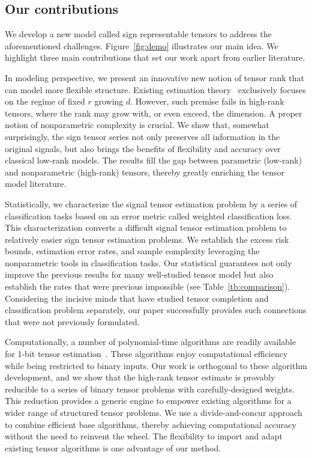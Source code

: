 \documentclass[twoside,11pt]{article}
\theoremstyle{plain}
\theoremstyle{definition}
\begin{document}
\subsection{Our contributions}
We develop a new model called sign representable tensors to address the aforementioned challenges. 
Figure~\ref{fig:demo} illustrates our main idea. 
We highlight three main contributions that set our work apart from earlier literature. 



In modeling perspective, we present an innovative new notion of tensor rank that can model more flexible structure. Existing estimation theory~\citep{anandkumar2014tensor,montanari2018spectral,cai2019nonconvex} exclusively focuses on the regime of fixed $r$ growing $d$. However, such premise fails in high-rank tensors, where the rank may grow with, or even exceed, the dimension. A proper notion of nonparametric complexity is crucial. We show that, somewhat surprisingly, the sign tensor series not only preserves all information in the original signals, but also brings the benefits of flexibility and accuracy over classical low-rank models. The results fill the gap between parametric (low-rank) and nonparametric (high-rank) tensors, thereby greatly enriching the tensor model literature. 

Statistically, we characterize the signal tensor estimation problem by a series of classification tasks based on an error metric called weighted classification loss. This characterization converts a difficult signal tensor estimation problem to  relatively easier sign tensor estimation problems.  
We establish the excess risk bounds, estimation error rates, and sample complexity leveraging the nonparametric tools in classification tasks. Our statistical guarantees not only improve the previous results for many well-studied tensor model but also establish the rates that were previous impossible (see Table~\ref{tb:comparison}).
Considering the incisive minds that have studied tensor completion and classification problem separately, our paper successfully provides such connections that were not previously formulated.
 

Computationally, a number of polynomial-time algorithms are readily available for 1-bit tensor estimation~\cite{wang2018learning, han2020optimal, ghadermarzy2018learning}. These algorithms enjoy computational efficiency while being restricted to binary inputs. Our work is orthogonal to these algorithm development, and we show that the high-rank tensor estimate is provably reducible to a series of binary tensor problems with carefully-designed weights. This reduction provides a generic engine to empower existing algorithms for a wider range of structured tensor problems. We use a divide-and-concur approach to combine efficient base algorithms, thereby achieving computational accuracy without the need to reinvent the wheel. The flexibility to import and adapt existing tensor algorithms is one advantage of our method. 
\end{document}
